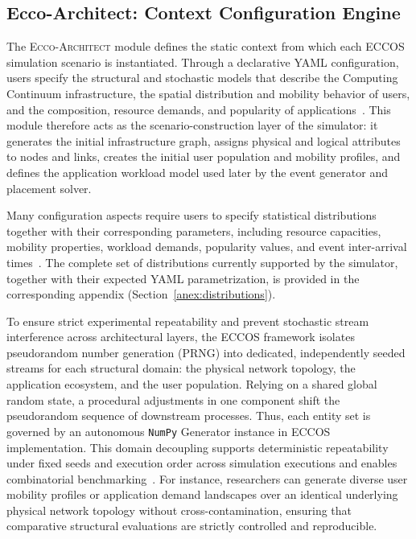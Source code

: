 \documentclass[ASNA]{USG} %
\begin{document}
\subsection{Ecco-Architect: Context Configuration Engine}
\label{sec:ecco_architect}

The \textsc{Ecco-Architect} module defines the static context from which each \textsc{ECCOS} simulation scenario is instantiated. Through a declarative YAML configuration, users specify the structural and stochastic models that describe the Computing Continuum infrastructure, the spatial distribution and mobility behavior of users, and the composition, resource demands, and popularity of applications~\cite{Akgul2023VFogSim}. This module therefore acts as the scenario-construction layer of the simulator: it generates the initial infrastructure graph, assigns physical and logical attributes to nodes and links, creates the initial user population and mobility profiles, and defines the application workload model used later by the event generator and placement solver.

Many configuration aspects require users to specify statistical distributions together with their corresponding parameters, including resource capacities, mobility properties, workload demands, popularity values, and event inter-arrival times~\cite{Lee2014Spatial, Zanella2023Characterizing, SolisMoreno2014Analysis}. The complete set of distributions currently supported by the simulator, together with their expected YAML parametrization, is provided in the corresponding appendix (Section~\ref{anex:distributions}).

To ensure strict experimental repeatability and prevent stochastic stream interference across architectural layers, the ECCOS framework isolates pseudorandom number generation (PRNG) into dedicated, independently seeded streams for each structural domain: the physical network topology, the application ecosystem, and the user population. Relying on a shared global random state, a procedural adjustments in one component shift the pseudorandom sequence of downstream processes. Thus, each entity set is governed by an autonomous \texttt{NumPy} Generator instance in ECCOS implementation. This domain decoupling supports deterministic repeatability under fixed seeds and execution order across simulation executions and enables combinatorial benchmarking~\cite{Jun2020Vectorization,Casadei2022A}. For instance, researchers can generate diverse user mobility profiles or application demand landscapes over an identical underlying physical network topology without cross-contamination, ensuring that comparative structural evaluations are strictly controlled and reproducible.
\end{document}
